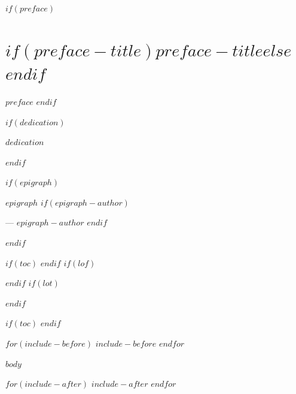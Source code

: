 \documentclass[
  $if(fontsize)$$fontsize$$else$11pt$endif$,
  twoside,
  $if(openany)$openany$else$openright$endif$
]{book}
\begin{document}
$if(preface)$
\chapter*{$if(preface-title)$$preface-title$$else$\prefacename$endif$}
$preface$
$endif$

$if(dedication)$
\handoutsclearchapterpage
\thispagestyle{plain}
\markboth{}{}
\null\vfill
\begin{center}
  \begin{minipage}{0.8\textwidth}
    \centering\itshape
    $dedication$
  \end{minipage}
\end{center}
\vfill\null
$endif$

$if(epigraph)$
\handoutsclearchapterpage
\thispagestyle{plain}
\markboth{}{}
\null\vfill
\begin{flushright}
  \begin{minipage}{0.72\textwidth}
    \itshape\raggedleft
    $epigraph$
    $if(epigraph-author)$
    \par\medskip
    --- \textnormal{\textsc{$epigraph-author$}}
    $endif$
  \end{minipage}
\end{flushright}
\vfill\null
$endif$

$if(toc)$
\tableofcontents
$endif$
$if(lof)$
\listoffigures
$endif$
$if(lot)$
\listoftables
$endif$

$if(toc)$
\clearpage
\blankpage
$endif$

\mainmatter
\pagestyle{mainmatter}
\RaggedRight
$for(include-before)$
$include-before$
$endfor$

$body$

$for(include-after)$
$include-after$
$endfor$
\end{document}
